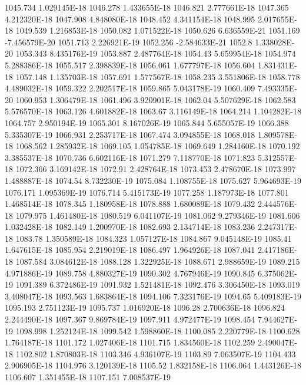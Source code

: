 1045.734  1.029145E-18
1046.278  1.433655E-18
1046.821  2.777661E-18
1047.365  4.212320E-18
1047.908  4.848080E-18
1048.452  4.341154E-18
1048.995  2.017655E-18
1049.539  1.216853E-18
1050.082  1.071522E-18
1050.626  6.636559E-21
1051.169  -7.456579E-20
1051.713  2.226921E-19
1052.256  -2.584633E-21
1052.8  1.338028E-20
1053.343  8.435176E-19
1053.887  2.487764E-18
1054.43  5.659954E-18
1054.974  5.288386E-18
1055.517  2.398839E-18
1056.061  1.677797E-18
1056.604  1.831431E-18
1057.148  1.135703E-18
1057.691  1.577567E-18
1058.235  3.551806E-18
1058.778  4.489032E-18
1059.322  2.202517E-18
1059.865  5.043178E-19
1060.409  7.493335E-20
1060.953  1.306479E-18
1061.496  3.920901E-18
1062.04  5.507629E-18
1062.583  5.576570E-18
1063.126  4.601882E-18
1063.67  3.116149E-18
1064.214  1.104282E-18
1064.757  2.950194E-19
1065.301  8.167026E-19
1065.844  5.655057E-19
1066.388  5.335307E-19
1066.931  2.253717E-18
1067.474  3.094855E-18
1068.018  1.809578E-18
1068.562  1.285932E-18
1069.105  1.054785E-18
1069.649  1.284160E-18
1070.192  3.385537E-18
1070.736  6.602116E-18
1071.279  7.118770E-18
1071.823  5.312557E-18
1072.366  3.169142E-18
1072.91  2.428764E-18
1073.453  2.478670E-18
1073.997  1.488887E-18
1074.54  8.732230E-19
1075.084  1.108755E-18
1075.627  5.964693E-19
1076.171  1.095369E-19
1076.714  5.415173E-19
1077.258  1.187973E-18
1077.801  1.468514E-18
1078.345  1.180958E-18
1078.888  1.680089E-18
1079.432  2.444576E-18
1079.975  1.461480E-18
1080.519  6.041107E-19
1081.062  9.279346E-19
1081.606  1.032428E-18
1082.149  1.200970E-18
1082.693  2.134714E-18
1083.236  2.247317E-18
1083.78  1.350589E-18
1084.323  1.057127E-18
1084.867  9.045148E-19
1085.41  1.647615E-18
1085.954  2.219019E-18
1086.497  1.964926E-18
1087.041  2.417186E-18
1087.584  3.084612E-18
1088.128  1.322925E-18
1088.671  2.988659E-19
1089.215  4.971886E-19
1089.758  4.880327E-19
1090.302  4.767946E-19
1090.845  6.375062E-19
1091.389  6.372486E-19
1091.932  1.521481E-18
1092.476  3.306450E-18
1093.019  3.408047E-18
1093.563  1.683864E-18
1094.106  7.323176E-19
1094.65  5.409183E-19
1095.193  2.751123E-19
1095.737  1.016920E-18
1096.28  2.700636E-18
1096.824  2.244490E-18
1097.367  9.869784E-19
1097.911  4.972477E-19
1098.454  7.944627E-19
1098.998  1.252124E-18
1099.542  1.598860E-18
1100.085  2.220779E-18
1100.628  1.764187E-18
1101.172  1.027406E-18
1101.715  1.834560E-18
1102.259  2.490047E-18
1102.802  1.870803E-18
1103.346  4.936107E-19
1103.89  7.063507E-19
1104.433  2.906905E-18
1104.976  3.120139E-18
1105.52  1.832158E-18
1106.064  1.443126E-18
1106.607  1.351455E-18
1107.151  7.008537E-19
